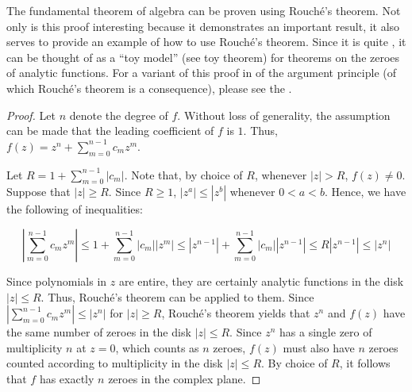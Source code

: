 \documentclass[12pt]{article}
\begin{document}
The fundamental theorem of algebra can be proven using Rouch\'e's theorem.  Not only is this proof interesting because it demonstrates an important result, it also serves to provide an example of how to use Rouch\'e's theorem.  Since it is quite , it can be thought of as a ``toy model'' (see toy theorem) for theorems on the zeroes of analytic functions.  For a variant of this proof in  of the argument principle (of which Rouch\'e's theorem is a consequence), please see the .

\begin{proof}
Let $n$ denote the degree of $f$.  Without loss of generality, the assumption can be made that the leading coefficient of $f$ is $1$.  Thus, $\displaystyle f(z)=z^n+\sum_{m=0}^{n-1} c_m z^m$.

Let $\displaystyle R=1+\sum_{m=0}^{n-1}|c_m|$.  Note that, by choice of $R$, whenever $|z|>R$, $f(z) \neq 0$.  Suppose that $|z| \ge R$.  Since $R \ge 1$, $|z^a| \le |z^b|$ whenever $0<a<b$.  Hence, we have the following  of inequalities:

$$\left| \sum_{m=0}^{n-1} c_m z^m \right| \le 1 + \sum_{m=0}^{n-1} |c_m| |z^m| \le |z^{n-1}| + \sum_{m=0}^{n-1} |c_m| |z^{n-1}| \le R |z^{n-1}| \le |z^n|$$

Since polynomials in $z$ are entire, they are certainly analytic functions in the disk $|z| \le R$.  Thus, Rouch\'e's theorem can be applied to them.  Since $\displaystyle \left| \sum_{m=0}^{n-1} c_m z^m \right| \le |z^n|$ for $|z| \ge R$, Rouch\'e's theorem yields that $z^n$ and $f(z)$ have the same number of zeroes in the disk $|z| \le R$.  Since $z^n$ has a single zero of multiplicity $n$ at $z=0$, which counts as $n$ zeroes, $f(z)$ must also have $n$ zeroes counted according to multiplicity in the disk $|z| \le R$.  By choice of $R$, it follows that $f$ has exactly $n$ zeroes in the complex plane.
\end{proof}
\end{document}
